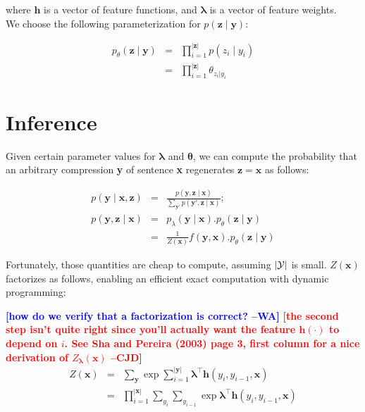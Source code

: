 \documentclass[11pt,onecolumn]{article}
\newcommand{\cjdcomment}[1]{\textcolor{red}{\bf\small [#1 --CJD]}}
\newcommand{\wacomment}[1]{\textcolor{blue}{\bf\small [#1 --WA]}}
\begin{document}
where $\mathbf{h}$ is a vector of feature functions, and $\boldsymbol{\lambda}$ is a vector of feature weights.\\

We choose the following parameterization for $p(\mathbf{z} \mid \mathbf{y})$:

\begin{eqnarray}
p_\theta(\mathbf{z} \mid \mathbf{y}) &=& \prod_{i=1}^{|\mathbf{z}|} p(z_i\mid y_i) \\
 &=& \prod_{i=1}^{|\mathbf{z}|} \theta_{z_i|y_i}
\end{eqnarray}

\section{Inference}
\label{sec:inference}
Given certain parameter values for $\boldsymbol{\lambda}$ and $\boldsymbol{\theta}$, we can compute the probability that an arbitrary compression \textbf{y} of sentence \textbf{x} regenerates $\mathbf{z} = \mathbf{x}$ as follows:

\begin{eqnarray}
p(\mathbf{y}\mid\mathbf{x}, \mathbf{z}) &=& \frac{p(\mathbf{y}, \mathbf{z} \mid \mathbf{x})}{\sum_{\mathbf{y'}} p(\mathbf{y'}, \mathbf{z} \mid \mathbf{x})}; \\
p(\mathbf{y}, \mathbf{z} \mid \mathbf{x}) &=& p_\lambda(\mathbf{y}\mid\mathbf{x}).p_\theta(\mathbf{z}\mid\mathbf{y}) \\
&=& \frac{1}{Z(\mathbf{x})}f(\mathbf{y}, \mathbf{x}).p_\theta(\mathbf{z}\mid\mathbf{y})
\end{eqnarray}

Fortunately, those quantities are cheap to compute, assuming $|\cal{Y}|$ is small. $Z(\mathbf{x})$ factorizes as follows, enabling an efficient exact computation with dynamic programming:

\wacomment{how do we verify that a factorization is correct?}
\cjdcomment{the second step isn't quite right since you'll actually want the feature $\mathbf{h}(\cdot)$ to depend on $i$. See Sha and Pereira (2003) page 3, first column for a nice derivation of $Z_{\boldsymbol{\lambda}}(\mathbf{x})$}
\begin{eqnarray}
Z(\mathbf{x}) &=& \sum_\mathbf{y} \exp \sum_{i=1}^{|\mathbf{y}|} \boldsymbol{\lambda}^\top \mathbf{h}(y_i, y_{i-1}, \mathbf{x}) \\
 &=& \prod_{i=1}^{|\mathbf{x}|} \sum_{y_i} \sum_{y_{i-1}} \exp \boldsymbol{\lambda}^\top \mathbf{h}(y_i, y_{i-1}, \mathbf{x})
\end{eqnarray}
\end{document}
